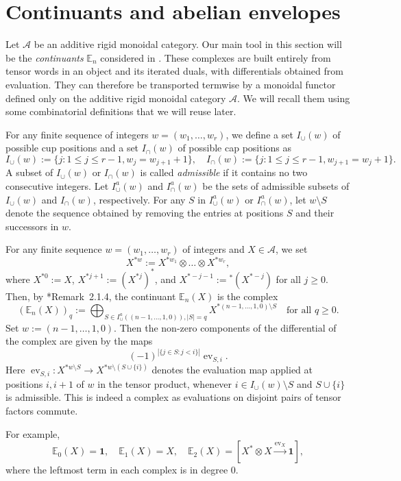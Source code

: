 \documentclass[11pt,oneside]{amsart}
\theoremstyle{definition}
\theoremstyle{remark}
\newcommand\EE{\mathbb E}
\newcommand\cA{\mathcal A}
\newcommand\ev{\operatorname{ev}}
\newcommand\tforall{\text{for all }}
\renewcommand\o\otimes
\renewcommand\:\colon
\newcommand\one{\mathbf 1}
\begin{document}
\section{Continuants and abelian envelopes} \label{sec:continuants}

Let $\cA$ be an additive rigid monoidal category. Our main tool in this section will be the \emph{continuants} $\EE_n$ considered in \cite{CE}. These complexes are built entirely from tensor words in an object and its iterated duals, with differentials obtained from evaluation. They can therefore be transported termwise by a monoidal functor defined only on the additive rigid monoidal category $\cA$. We will recall them using some combinatorial definitions that we will reuse later.

\begin{definition} \label{def:admissible}
    For any finite sequence of integers $w=(w_1,\dots,w_r)$, we define a set $I_\cup(w)$ of possible cup positions and a set $I_\cap(w)$ of possible cap positions as
$$
I_\cup(w) := \{ j: 1\le j\le r-1, w_j = w_{j+1}+1 \} ,\quad
I_\cap(w) := \{ j: 1\le j\le r-1, w_{j+1} = w_j+1 \} .
$$
A subset of $I_\cup(w)$ or $I_\cap(w)$ is called \emph{admissible} if it contains no two consecutive integers. Let $I^a_\cup(w)$ and $I^a_\cap(w)$ be the sets of admissible subsets of $I_\cup(w)$ and $I_\cap(w)$, respectively. For any $S$ in $I^a_\cup(w)$ or $I^a_\cap(w)$, let $w\setminus S$ denote the sequence obtained by removing the entries at positions $S$ and their successors in $w$. 
\end{definition}

For any finite sequence $w=(w_1,\dots,w_r)$ of integers and $X\in\cA$, we set
$$
X^{*w} := X^{* w_1}\o\dots\o X^{* w_r} ,
$$
where $X^{*0}:=X$, $X^{*j+1}:=(X^{*j})^*$, and $X^{*-j-1}:={}^*(X^{*-j})$ for all $j\ge0$. Then, by \cite{CE}*{Remark~2.1.4}, the continuant $\EE_n(X)$ is the complex 
$$
(\EE_n(X))_q := \bigoplus_{S\in I^a_\cup((n-1,\dots,1,0)), |S|=q} X^{* (n-1,\dots,1,0)\setminus S}
\quad\tforall q\ge0 .
$$
Set $w:=(n-1,\dots,1,0)$. Then the non-zero components of the differential of the complex are given by the maps 
$$(-1)^{|\{j\in S:j<i\}|} \ev_{S,i}.$$
Here $\ev_{S,i}\:  X^{*w\setminus S}\to X^{*w\setminus(S\cup\{i\})}$ denotes the evaluation map applied at positions $i,i+1$ of $w$ in the tensor product, whenever $i\in I_\cup(w)\setminus S$ and $S\cup\{i\}$ is admissible. This is indeed a complex as evaluations on disjoint pairs of tensor factors commute.

For example, 
$$
\EE_0(X) = \one ,\quad
\EE_1(X) = X, \quad
\EE_2(X) = [X^* \o X \xrightarrow{\ev_X} \one] ,
$$
where the leftmost term in each complex is in degree $0$. 
\end{document}
